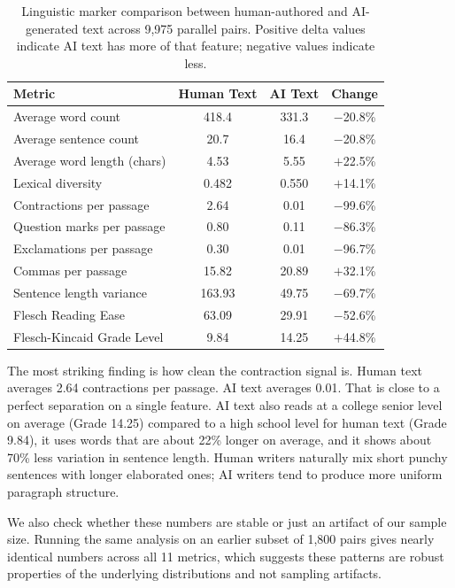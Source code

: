 \documentclass{article}
\begin{document}
\begin{table}[ht]
\centering
\caption{Linguistic marker comparison between human-authored and AI-generated text across 9,975 parallel pairs. Positive delta values indicate AI text has more of that feature; negative values indicate less.}
\label{tab:linguistic_markers}
\vspace{4pt}
\begin{tabular}{lccc}
\toprule
\textbf{Metric} & \textbf{Human Text} & \textbf{AI Text} & \textbf{Change} \\
\midrule
Average word count & 418.4 & 331.3 & $-$20.8\% \\
Average sentence count & 20.7 & 16.4 & $-$20.8\% \\
Average word length (chars) & 4.53 & 5.55 & $+$22.5\% \\
Lexical diversity & 0.482 & 0.550 & $+$14.1\% \\
Contractions per passage & 2.64 & 0.01 & $-$99.6\% \\
Question marks per passage & 0.80 & 0.11 & $-$86.3\% \\
Exclamations per passage & 0.30 & 0.01 & $-$96.7\% \\
Commas per passage & 15.82 & 20.89 & $+$32.1\% \\
Sentence length variance & 163.93 & 49.75 & $-$69.7\% \\
Flesch Reading Ease & 63.09 & 29.91 & $-$52.6\% \\
Flesch-Kincaid Grade Level & 9.84 & 14.25 & $+$44.8\% \\
\bottomrule
\end{tabular}
\end{table}

The most striking finding is how clean the contraction signal is. Human text averages 2.64 contractions per passage. AI text averages 0.01. That is close to a perfect separation on a single feature. AI text also reads at a college senior level on average (Grade 14.25) compared to a high school level for human text (Grade 9.84), it uses words that are about 22\% longer on average, and it shows about 70\% less variation in sentence length. Human writers naturally mix short punchy sentences with longer elaborated ones; AI writers tend to produce more uniform paragraph structure.

We also check whether these numbers are stable or just an artifact of our sample size. Running the same analysis on an earlier subset of 1,800 pairs gives nearly identical numbers across all 11 metrics, which suggests these patterns are robust properties of the underlying distributions and not sampling artifacts.
\end{document}

